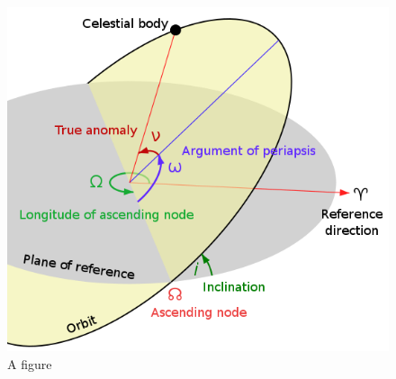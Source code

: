 \documentclass{article}
\makeatletter
\renewcommand\section{\clearpage\newpage\@startsection {section}{1}{\z@}%
	{-3.5ex \@plus -1ex \@minus -.2ex}%
	{2.3ex \@plus.2ex}%
	{\normalfont\Large\bfseries}}
\makeatother
\begin{document}
\begin{figure}[h]
	\centering
	\caption{A figure}
	\includegraphics[scale=0.35]{keplerian-elements}
\end{figure}

%
%
%


\end{document}
